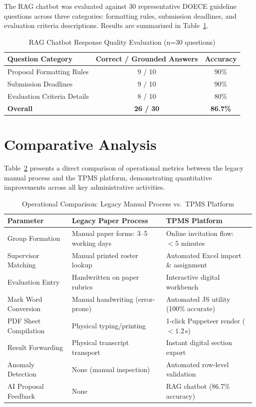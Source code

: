 \documentclass[12pt]{report}
\begin{document}
The RAG chatbot was evaluated against 30 representative DOECE guideline questions across three categories: formatting rules, submission deadlines, and evaluation criteria descriptions. Results are summarized in Table~\ref{tab:rag_eval}.

\begin{table}[H]
\centering
\caption{RAG Chatbot Response Quality Evaluation (n=30 questions)}\label{tab:rag_eval}
\begin{tabular}{l c c}
\toprule
\textbf{Question Category} & \textbf{Correct / Grounded Answers} & \textbf{Accuracy}\\
\midrule
Proposal Formatting Rules   & 9 / 10  & 90\%\\
Submission Deadlines        & 9 / 10  & 90\%\\
Evaluation Criteria Details & 8 / 10  & 80\%\\
\midrule
\textbf{Overall}            & \textbf{26 / 30} & \textbf{86.7\%}\\
\bottomrule
\end{tabular}
\end{table}

\section{Comparative Analysis}

Table~\ref{tab:comparison} presents a direct comparison of operational metrics between the legacy manual process and the TPMS platform, demonstrating quantitative improvements across all key administrative activities.

\begin{table}[H]
\centering
\caption{Operational Comparison: Legacy Manual Process vs.\ TPMS Platform}\label{tab:comparison}
\begin{tabularx}{\textwidth}{l X X}
\toprule
\textbf{Parameter} & \textbf{Legacy Paper Process} & \textbf{TPMS Platform}\\
\midrule
Group Formation & Manual paper forms: 3--5 working days & Online invitation flow: $<5$ minutes\\
Supervisor Matching & Manual printed roster lookup & Automated Excel import \& assignment\\
Evaluation Entry & Handwritten on paper rubrics & Interactive digital workbench\\
Mark Word Conversion & Manual handwriting (error-prone) & Automated JS utility (100\% accurate)\\
PDF Sheet Compilation & Physical typing/printing & 1-click Puppeteer render ($<1.2$\,s)\\
Result Forwarding & Physical transcript transport & Instant digital section export\\
Anomaly Detection & None (manual inspection) & Automated row-level validation\\
AI Proposal Feedback & None & RAG chatbot (86.7\% accuracy)\\
\bottomrule
\end{tabularx}
\end{table}
\end{document}
